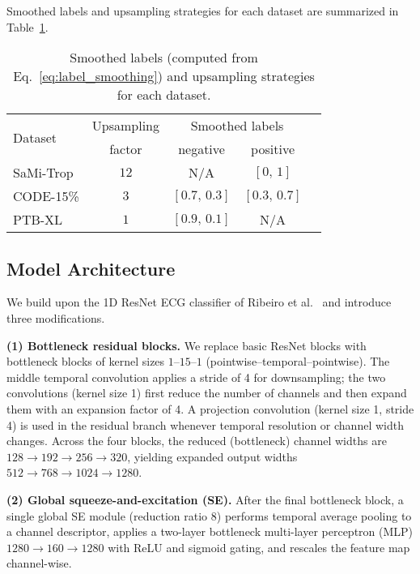 \documentclass[twocolumn]{cinc}
\begin{document}
Smoothed labels and upsampling strategies for each dataset are summarized in Table~\ref{tab:augmentation}.


\begin{table}[!htp]
\centering
\begin{tabular}{lcccc}
\toprule
\multirow{2}{*}{Dataset} & Upsampling & \multicolumn{2}{c}{Smoothed labels} \\ \cmidrule(lr){3-4}
& factor & negative & positive \\
\midrule
SaMi-Trop & $12$ & N/A          & $[0,\,1]$     \\
CODE-15\% & $3$ & $[0.7,\,0.3]$ & $[0.3,\,0.7]$ \\
PTB-XL    & $1$ & $[0.9,\,0.1]$ & N/A           \\
\bottomrule
\end{tabular}
\caption{Smoothed labels (computed from Eq.~\ref{eq:label_smoothing}) and upsampling strategies for each dataset.}
\label{tab:augmentation}
\end{table}


\subsection{Model Architecture}
\label{subsec:model}


We build upon the 1D ResNet ECG classifier of Ribeiro et al.~\cite{ribeiro2020automatic} and introduce three modifications.

\textbf{(1) Bottleneck residual blocks.} We replace basic ResNet blocks with bottleneck blocks of kernel sizes $1$–$15$–$1$ (pointwise--temporal--pointwise). The middle temporal convolution applies a stride of 4 for downsampling; the two convolutions (kernel size 1) first reduce the number of channels and then expand them with an expansion factor of 4. A projection convolution (kernel size 1, stride 4) is used in the residual branch whenever temporal resolution or channel width changes. Across the four blocks, the reduced (bottleneck) channel widths are $128 \to 192 \to 256 \to 320$, yielding expanded output widths $512 \to 768 \to 1024 \to 1280$.

\textbf{(2) Global squeeze-and-excitation (SE).} After the final bottleneck block, a single global SE module (reduction ratio 8) \cite{hu2018senet} performs temporal average pooling to a channel descriptor, applies a two-layer bottleneck multi-layer perceptron (MLP) $1280 \to 160 \to 1280$ with ReLU and sigmoid gating, and rescales the feature map channel-wise.
\end{document}

